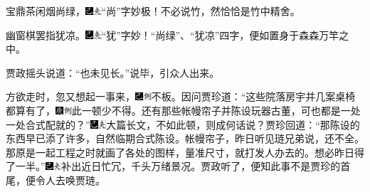 宝鼎茶闲烟尚绿，{\includegraphics[width=3mm]{../Images/00003}\includegraphics[width=3mm]{../Images/00012}\footnotesize \kaishu ``尚''字妙极！不必说竹，然恰恰是竹中精舍。}

幽窗棋罢指犹凉。{\includegraphics[width=3mm]{../Images/00003}\includegraphics[width=3mm]{../Images/00012}\footnotesize \kaishu ``犹''字妙！``尚绿''、``犹凉''四字，便如置身于森森万竿之中。}

贾政摇头说道：``也未见长。''说毕，引众人出来。

方欲走时，忽又想起一事来，{\includegraphics[width=3mm]{../Images/00003}\includegraphics[width=3mm]{../Images/00011}\footnotesize \kaishu 不板。}因问贾珍道：``这些院落房宇并几案桌椅都算有了，{\includegraphics[width=3mm]{../Images/00004}\includegraphics[width=3mm]{../Images/00011}\footnotesize \kaishu 此一顿少不得。}还有那些帐幔帘子并陈设玩器古董，可也都是一处一处合式配就的？''{\includegraphics[width=3mm]{../Images/00003}\includegraphics[width=3mm]{../Images/00012}\footnotesize \kaishu 大篇长文，不如此顿，则成何话说？}贾珍回道：``那陈设的东西早已添了许多，自然临期合式陈设。帐幔帘子，昨日听见琏兄弟说，还不全。那原是一起工程之时就画了各处的图样，量准尺寸，就打发人办去的。想必昨日得了一半。''{\includegraphics[width=3mm]{../Images/00003}\includegraphics[width=3mm]{../Images/00012}\footnotesize \kaishu 补出近日忙冗，千头万绪景况。}贾政听了，便知此事不是贾珍的首尾，便令人去唤贾琏。

